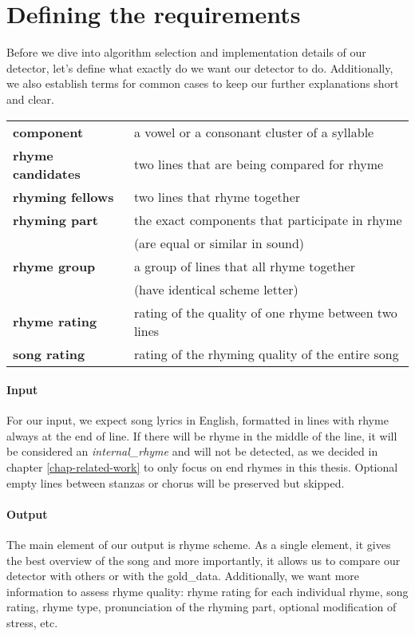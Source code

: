 \section{Defining the requirements}\label{defining_the_requirements}
Before we dive into algorithm selection and implementation details of our detector, let's define what exactly do we want our detector to do. Additionally, we also establish terms for common cases to keep our further explanations short and clear.
\begin{table}[h!]
	\centering
	\begin{tabular}{>{\bfseries}l l} 
		component & a vowel or a consonant cluster of a syllable\\
		rhyme candidates & two lines that are being compared for rhyme \\
		rhyming fellows & two lines that rhyme together\\
		rhyming part & the exact components that participate in rhyme \\&(are equal or similar in sound)\\
		rhyme group & a group of lines that all rhyme together\\& (have identical scheme letter) \\
		rhyme rating & rating of the quality of one rhyme between two lines\\
		song rating & rating of the rhyming quality of the entire song\\
	\end{tabular}
	\label{terms}
\end{table}

\paragraph{Input}
For our input, we expect song lyrics in English, formatted in lines with rhyme always at the end of line. If there will be rhyme in the middle of the line, it will be considered an \textit{\gls{internal_rhyme}} and will not be detected, as we decided in chapter \ref{chap-related-work} to only focus on end rhymes in this thesis. Optional empty lines between stanzas or chorus will be preserved but skipped.

\paragraph{Output}
The main element of our output is rhyme scheme. As a single element, it gives the best overview of the song and more importantly, it allows us to compare our detector with others or with the \gls{gold_data}. Additionally, we want more information to assess rhyme quality: rhyme rating for each individual rhyme, song rating, rhyme type, pronunciation of the rhyming part, optional modification of stress, etc.


